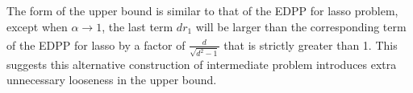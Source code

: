 The form of the upper bound is similar to that of the EDPP for lasso problem, except when $\alpha\xrightarrow[]{}1$, the last term $dr_1$ will be larger than the corresponding term of the EDPP for lasso by a factor of $\frac{d}{\sqrt{d^2-1}}$ that is strictly greater than 1. This suggests this alternative construction of intermediate problem introduces extra unnecessary looseness in the upper bound.

\doublespace
